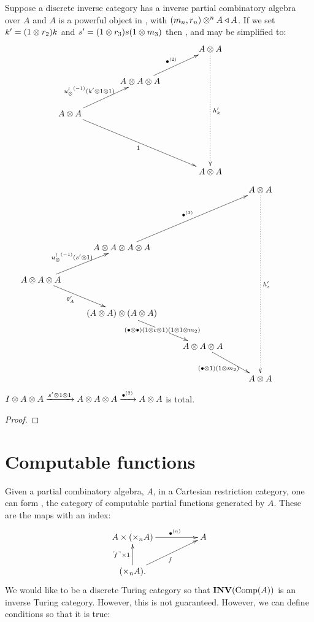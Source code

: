 \begin{lemma}\label{lem:powerful_inverse_partial_combinatory_algebra}
  Suppose a discrete inverse category \X has a inverse partial combinatory algebra over $A$ and $A$
  is  a powerful object in \X, with $(m_n,r_n)\otimes^n A \triangleleft A$. If we set $k' = (1\otimes r_2)k$ and
  $s'=(1\otimes r_3) s (1\otimes m_3)$ then ,  and  may be
  simplified to:\\
    \[
      \xymatrix@C+15pt{
         && A\*A \ar@{.>}[dddd]^{h'_k}\\
        &A\* A\* A \ar[ur]^{\multibullet{2}} & & \\
        A\* A \ar[ur]^{\inv{\usl}(k'\*1\*1)\ \,} \ar[ddrr]_{1} && &\\
         && & \\
        && A\*A &
      }
    \]
    \[
      \xymatrix{
        &&& A\* A \ar@{.>}[dddddd]^{h'_s} \\
        & &  && \\
        &A\* A\* A\* A
          \ar[uurr]^{\multibullet{3}}\\
        A\* A\* A \ar[ur]^{\inv{\usl}(s'\*1)} \ar[dr]_(.4){\theta_A'}\\
        &(A\* A) \* (A\* A) \ar[dr]|{(\bullet\*\bullet)(1\*c\*1)(1\*1\*m_2)} \\
        & &A\* A\* A\ar[dr]_{(\bullet\*1)(1\*m_2)}& &\\
        &&&A\*A \\
      }
    \]
    $I\otimes A\otimes A \xrightarrow{s'\otimes1\otimes1} A\otimes A\otimes A \xrightarrow{{\bullet}^{(2)}} A\otimes A$
   is total.
\end{lemma}
\begin{proof}

\end{proof}

\section{Computable functions}
\label{sec:computable_functions}

Given a partial combinatory algebra, $A$, in a Cartesian restriction category, one can form \compa,
the category of computable partial functions generated by $A$. These are the maps with an index:
\[
  \xymatrix@C+25pt{
    A\times (\times_n A) \ar[r]^(.6){\multibullet{n}} & A \\
    (\times_n A). \ar[u]^{\name{f}\times 1} \ar[ur]_f
  }
\]
We would like \compa to be a discrete Turing category so that $\mathbf{INV}({\text{Comp}(A)})$ is an inverse Turing
category. However, this is not guaranteed.  However, we can define conditions so that it is true:

